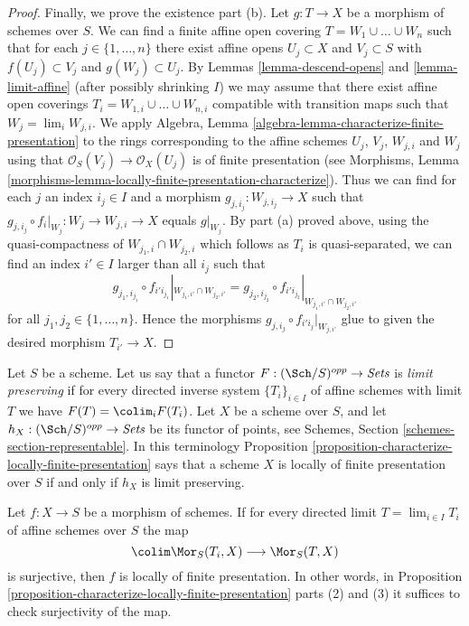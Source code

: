 \begin{proof}
\medskip\noindent
Finally, we prove the existence part (b).
Let $g : T \to X$ be a morphism of schemes over $S$.
We can find a finite affine open covering
$T = W_1 \cup \ldots \cup W_n$ such that for
each $j \in \{1, \ldots, n\}$ there exist affine opens
$U_j \subset X$ and $V_j \subset S$ with $f(U_j) \subset V_j$
and $g(W_j) \subset U_j$. By Lemmas \ref{lemma-descend-opens}
and \ref{lemma-limit-affine}
(after possibly shrinking $I$) we may assume that
there exist affine open coverings $T_i = W_{1, i} \cup \ldots \cup W_{n, i}$
compatible with transition maps such that $W_j = \lim_i W_{j, i}$.
We apply Algebra, Lemma \ref{algebra-lemma-characterize-finite-presentation}
to the rings corresponding to the affine schemes $U_j$, $V_j$, $W_{j, i}$ and
$W_j$ using that $\mathcal{O}_S(V_j) \to \mathcal{O}_X(U_j)$ is of finite
presentation (see Morphisms,
Lemma \ref{morphisms-lemma-locally-finite-presentation-characterize}).
Thus we can find for each $j$ an index $i_j \in I$ and a morphism
$g_{j, i_j} : W_{j, i_j} \to X$ such that
$g_{j, i_j} \circ f_i|_{W_j} : W_j \to W_{j, i} \to X$
equals $g|_{W_j}$. By part (a) proved above, using the quasi-compactness of
$W_{j_1, i} \cap W_{j_2, i}$ which follows as $T_i$ is quasi-separated,
we can find an index $i' \in I$ larger than all $i_j$ such that
$$
g_{j_1, i_{j_1}} \circ f_{i'i_{j_1}}|_{W_{j_1, i'} \cap W_{j_2, i'}} =
g_{j_2, i_{j_2}} \circ f_{i'i_{j_2}}|_{W_{j_1, i'} \cap W_{j_2, i'}}
$$
for all $j_1, j_2 \in \{1, \ldots, n\}$. Hence the morphisms
$g_{j, i_j} \circ f_{i'i_j}|_{W_{j, i'}}$ glue to given the
desired morphism $T_{i'} \to X$.
\end{proof}

\begin{remark}
\label{remark-limit-preserving}
Let $S$ be a scheme. Let us say that a functor
$F : (\Sch/S)^{opp} \to \textit{Sets}$ is
{\it limit preserving} if for every directed inverse system
$\{T_i\}_{i \in I}$ of affine schemes with limit $T$ we have
$F(T) = \colim_i F(T_i)$. Let $X$ be a scheme over $S$, and
let $h_X : (\Sch/S)^{opp} \to \textit{Sets}$ be its
functor of points, see
Schemes, Section \ref{schemes-section-representable}.
In this terminology
Proposition \ref{proposition-characterize-locally-finite-presentation}
says that a scheme $X$ is locally of finite presentation over
$S$ if and only if $h_X$ is limit preserving.
\end{remark}

\begin{lemma}
\label{lemma-surjection-is-enough}
Let $f : X \to S$ be a morphism of schemes. If for every directed limit
$T = \lim_{i \in I} T_i$ of affine schemes over $S$ the map
$$
\colim \Mor_S(T_i, X) \longrightarrow \Mor_S(T, X)
$$
is surjective, then $f$ is locally of finite presentation.
In other words, in
Proposition \ref{proposition-characterize-locally-finite-presentation}
parts (2) and (3) it suffices to check surjectivity of the map.
\end{lemma}


